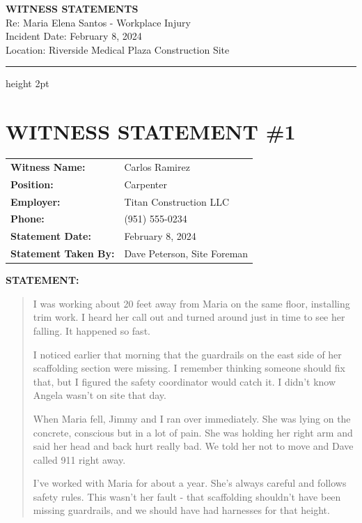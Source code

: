 \documentclass[11pt]{article}
\begin{document}
\begin{center}
{\LARGE\bfseries WITNESS STATEMENTS}\\[0.5em]
{\large Re: Maria Elena Santos - Workplace Injury}\\[0.3em]
{\normalsize Incident Date: February 8, 2024}\\
{\normalsize Location: Riverside Medical Plaza Construction Site}
\end{center}

\vspace{1em}
\hrule height 2pt
\vspace{2em}

\section*{WITNESS STATEMENT \#1}

\begin{tabular}{@{}p{4cm}p{10cm}@{}}
\textbf{Witness Name:} & Carlos Ramirez \\
\textbf{Position:} & Carpenter \\
\textbf{Employer:} & Titan Construction LLC \\
\textbf{Phone:} & (951) 555-0234 \\
\textbf{Statement Date:} & February 8, 2024 \\
\textbf{Statement Taken By:} & Dave Peterson, Site Foreman \\
\end{tabular}

\vspace{1em}

\noindent\textbf{STATEMENT:}

\begin{quote}
I was working about 20 feet away from Maria on the same floor, installing trim work. I heard her call out and turned around just in time to see her falling. It happened so fast.

I noticed earlier that morning that the guardrails on the east side of her scaffolding section were missing. I remember thinking someone should fix that, but I figured the safety coordinator would catch it. I didn't know Angela wasn't on site that day.

When Maria fell, Jimmy and I ran over immediately. She was lying on the concrete, conscious but in a lot of pain. She was holding her right arm and said her head and back hurt really bad. We told her not to move and Dave called 911 right away.

I've worked with Maria for about a year. She's always careful and follows safety rules. This wasn't her fault - that scaffolding shouldn't have been missing guardrails, and we should have had harnesses for that height.
\end{quote}
\end{document}
